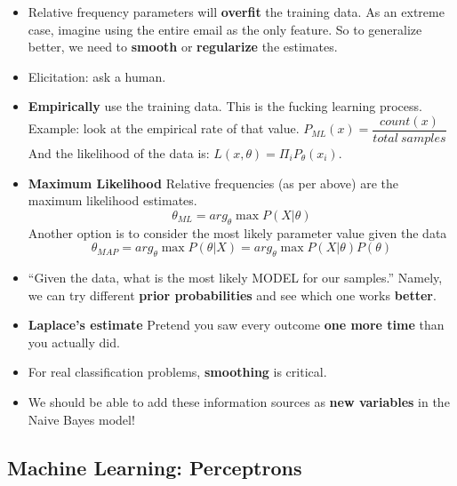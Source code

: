 \documentclass[twocolumn]{article}
\begin{document}
\begin{itemize}
{    concepts}. 
\item Relative frequency parameters will \textbf{overfit} the training
  data. As an extreme case, imagine using the entire email as the only
  feature. So to generalize better, we need to \textbf{smooth} or
  \textbf{regularize} the estimates.
\item Elicitation: ask a human.
\item \textbf{Empirically} use the training data. This is the fucking
  learning process. Example: look at the empirical rate of that
  value. $P_{ML}(x)=\dfrac{count(x)}{total~samples}$ And the
  likelihood of the data is: $L(x,\theta)=\Pi_{i}P_{\theta}(x_{i})$.
\item \textbf{Maximum Likelihood} Relative frequencies (as per above)
  are the maximum likelihood estimates. 
  $$\theta_{ML}=arg_{\theta}\max P(X|\theta)$$
  Another option is to consider the most likely parameter value given
  the data
  $$\theta_{MAP}=arg_{\theta}\max P(\theta|X)=arg_{\theta}\max
  P(X|\theta)P(\theta)$$ 
\item ``Given the data, what is the most likely MODEL for our
  samples.'' Namely, we can try different \textbf{prior probabilities}
  and see which one works \textbf{better}.
\item \textbf{Laplace's estimate} Pretend you saw every outcome
  \textbf{one more time} than you actually did.
\item For real classification problems, \textbf{smoothing} is
  critical.
\item We should be able to add these information sources as
  \textbf{new variables} in the Naive Bayes model!
\end{itemize}


\subsection{Machine Learning: Perceptrons}
\label{sec:mach-learn-perc}
\end{document}

